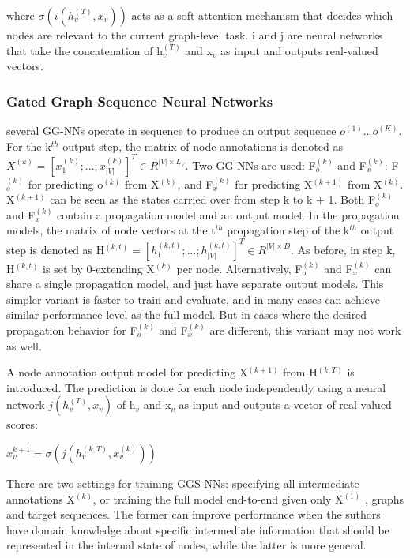 \documentclass{article}
\begin{document}
where $\sigma(i(h_v^{(T)},x_v))$ acts as a soft attention mechanism that decides which nodes are relevant to the current graph-level task. i and j are neural networks that take the concatenation of h$_v^{(T)}$ and x$_v$ as input and outputs real-valued vectors.
\subsubsection{Gated Graph Sequence Neural Networks}
several GG-NNs operate in sequence to produce an output sequence $o^{(1)} . . . o^{(K )}$. For the k$^{th}$ output step, the matrix of node annotations is denoted as $X^{(k)} = [x_1^{(k)}; . . . ; x_{|V|}^{(k)}]^T \in R^{|V|×L_V}$. Two GG-NNs are used: F$_o^{(k)}$ and F$_x^{(k)}$: F$_o^{(k)}$ for predicting o$^{(k)}$ from X$^{(k)}$, and F$^{(k)}_x$ for predicting X$^{(k+1)}$ from X$^{(k)}$. X$^{(k+1)}$ can be seen as the states carried over from step k to k + 1. Both F$_o^{(k)}$ and F$_x^{(k)}$ contain a propagation model and an output model. In the propagation models, the matrix of node vectors  at the t$^{th}$ propagation step of the k$^{th}$ output step is denoted as H$^{(k,t)} = [h_1^{(k,t)};...;h_{|V|}^{(k,t)}]^T \in R^{|V|×D}$. As before, in step k, H$^{(k,t)}$ is set by 0-extending X$^{(k)}$ per node. Alternatively, F$_o^{(k)}$ and F$_x^{(k)}$ can share a single propagation model, and just have separate output models. This simpler variant is faster to train and evaluate, and in many cases can achieve similar performance level as the full model. But in cases where the desired propagation behavior for F$_o^{(k)}$ and F$_x^{(k)}$ are different, this variant may not work as well.

A node annotation output model for predicting X$^{(k+1)}$ from H$^{(k,T)}$ is introduced. The prediction is done for each node independently using a neural network $j(h_v^{(T)},x_v)$ of h$_v$ and x$_v$ as input and outputs a vector of real-valued scores:

\begin{math}
x_v^{k+1} = \sigma(j(h_v^{(k,T)},x_v^{(k)}))
\end{math}

There are two settings for training GGS-NNs: specifying all intermediate annotations X$^{(k)}$, or training the full model end-to-end given only X$^{(1)}$ , graphs and target sequences. The former can improve performance when the suthors have domain knowledge about specific intermediate information that should be represented in the internal state of nodes, while the latter is more general.
\end{document}
